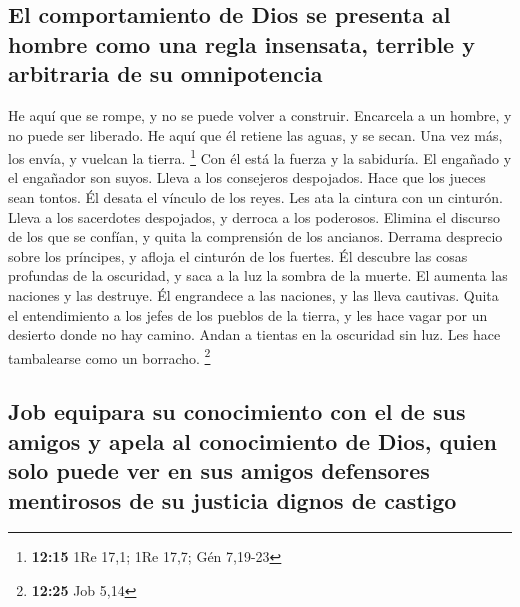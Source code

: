 \hypertarget{el-comportamiento-de-dios-se-presenta-al-hombre-como-una-regla-insensata-terrible-y-arbitraria-de-su-omnipotencia}{%
\subsection{El comportamiento de Dios se presenta al hombre como una
regla insensata, terrible y arbitraria de su
omnipotencia}\label{el-comportamiento-de-dios-se-presenta-al-hombre-como-una-regla-insensata-terrible-y-arbitraria-de-su-omnipotencia}}

 He aquí que se rompe, y no se puede volver a construir.
Encarcela a un hombre, y no puede ser liberado.  He aquí
que él retiene las aguas, y se secan. Una vez más, los envía, y vuelcan
la tierra. \footnote{\textbf{12:15} 1Re 17,1; 1Re 17,7; Gén 7,19-23}
 Con él está la fuerza y la sabiduría. El engañado y el
engañador son suyos.  Lleva a los consejeros despojados.
Hace que los jueces sean tontos.  Él desata el vínculo de
los reyes. Les ata la cintura con un cinturón.  Lleva a
los sacerdotes despojados, y derroca a los poderosos. 
Elimina el discurso de los que se confían, y quita la comprensión de los
ancianos.  Derrama desprecio sobre los príncipes, y
afloja el cinturón de los fuertes.  Él descubre las cosas
profundas de la oscuridad, y saca a la luz la sombra de la muerte.
 El aumenta las naciones y las destruye. Él engrandece a
las naciones, y las lleva cautivas.  Quita el
entendimiento a los jefes de los pueblos de la tierra, y les hace vagar
por un desierto donde no hay camino.  Andan a tientas en
la oscuridad sin luz. Les hace tambalearse como un borracho. \footnote{\textbf{12:25}
  Job 5,14}

\hypertarget{job-equipara-su-conocimiento-con-el-de-sus-amigos-y-apela-al-conocimiento-de-dios-quien-solo-puede-ver-en-sus-amigos-defensores-mentirosos-de-su-justicia-dignos-de-castigo}{%
\subsection{Job equipara su conocimiento con el de sus amigos y apela al
conocimiento de Dios, quien solo puede ver en sus amigos defensores
mentirosos de su justicia dignos de
castigo}\label{job-equipara-su-conocimiento-con-el-de-sus-amigos-y-apela-al-conocimiento-de-dios-quien-solo-puede-ver-en-sus-amigos-defensores-mentirosos-de-su-justicia-dignos-de-castigo}}


